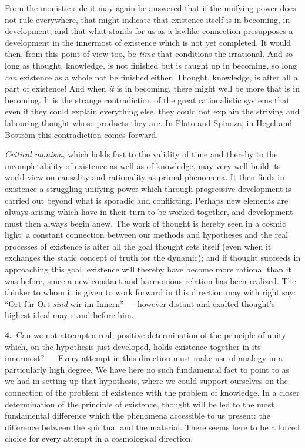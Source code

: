 \documentclass[12pt,a4paper]{book}
\newcommand{\opage}[1]{\marginnote{\footnotesize\textit{[#1]}}}
\begin{document}
From the monistic side it may again be answered that if the unifying power does
not rule everywhere, that might indicate that existence itself is in becoming, in
development, and that what stands for us as a lawlike connection presupposes a
development in the innermost of existence which is not yet completed. It would
then, from this point of view too, be \emph{time} that conditions the irrational.
And so long as thought, knowledge, is not finished \opage{62}but is caught up in becoming,
so long \emph{can} existence as a whole not be finished either. Thought,
knowledge, is after all a part of existence! And when \emph{it} is in becoming,
there might well be more that is in becoming. It is the strange contradiction of
the great rationalistic systems that even if they could explain everything else,
they could not explain the striving and labouring thought whose products they
are. In Plato and Spinoza, in Hegel and Boström this contradiction comes forward.

\emph{Critical monism}, which holds fast to the validity of time and thereby to
the incompletability of existence as well as of knowledge, may very well build
its world-view on causality and rationality as primal phenomena. It then finds in
existence a struggling unifying power which through progressive development is
carried out beyond what is sporadic and conflicting. Perhaps new elements are
always arising which have in their turn to be worked together, and development
must then always begin anew. The work of thought is hereby seen in a cosmic
light: a constant connection between our methods and hypotheses and the real
processes of existence is after all the goal thought sets itself (even when it
exchanges the static concept of truth for the dynamic); and if thought succeeds
in approaching this goal, existence will thereby have become more rational than
it was before, since a new constant and harmonious relation has been realized.
The thinker to whom it is given to work forward in this direction may with right
say: ``Ort für Ort \textit{sind} wir im Innern'' --- however distant and exalted
thought's highest ideal may stand before him.

\noindent\textbf{4.}~Can we not attempt a real, positive determination of the
principle of unity which, on the hypothesis just developed, holds existence
together in its innermost? --- Every attempt in this direction must make use of
analogy in a particularly high degree. We have here no such fundamental fact to
point to as we had in setting up that hypothesis, where we could support
ourselves on the connection of the problem of existence with the problem of
knowledge. In a closer determination of the principle of existence, thought will
be led to the most fundamental difference which the phenomena accessible to us
present: the difference between the spiritual and \opage{63}the material. There seems here
to be a forced choice for every attempt in a cosmological direction.
\end{document}
